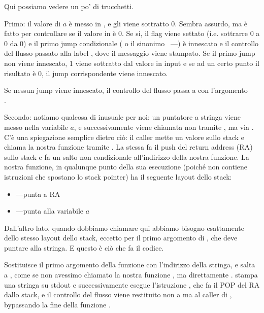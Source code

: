 Qui possiamo vedere un po' di trucchetti.


Primo: il valore di $a$ è messo in \EAX, e gli viene sottratto 0. Sembra assurdo, ma è fatto per controllare se il valore 
in \EAX è 0. Se si, il flag \ZF viene settato (i.e. sottrarre 0 a 0 da 0)
e il primo jump condizionale \JE ( o il sinonimo \JZ~---) è innescato e il controllo del flusso 
passato alla label , dove il messaggio  viene stampato. 
Se il primo jump non viene innescato, 1 viene sottratto dal valore in input e se ad un certo punto il risultato è 0, il jump corrispondente
viene innescato.

Se nessun jump viene innescato, il controllo del flusso passa a \printf con l'argomento \\
.

\label{jump_to_last_printf}
\myindex{\Stack}

Secondo: notiamo qualcosa di inusuale per noi: un puntatore a stringa viene messo nella variabile $a$, e 
successivamente viene chiamata \printf non tramite \CALL, ma via \JMP. C'è una spiegazione semplice dietro ciò: 
il \gls{caller} mette un valore sullo stack e chiama la nostra funzione tramite \CALL. 
La stessa \CALL fa il push del return address (\ac{RA}) sullo stack e fa un salto non condizionale all'indirizzo della nostra funzione. 
La nostra funzione, in qualunque punto della sua esecuzione (poiché non contiene istruzioni che spostano lo stack pointer)
ha il seguente layout dello stack:

\begin{itemize}
\item\ESP---punta a \ac{RA}
\item{}---punta alla variabile $a$ 
\end{itemize}

Dall'altro lato, quando dobbiamo chiamare \printf qui abbiamo bisogno esattamente dello stesso layout dello stack,
eccetto per il primo argomento di \printf, che deve puntare alla stringa. 
E questo è ciò che fa il codice.

Sostituisce il primo argomento della funzione con l'indirizzo della stringa, e salta a \printf, come se non avessimo chiamato
la nostra funzione \ttf, ma direttamente \printf.
\printf stampa una stringa su \gls{stdout} e successivamente esegue l'istruzione \RET , che fa il POP del 
\ac{RA} dallo stack, e il controllo del flusso viene restituito non a \ttf ma al \gls{caller} di \ttf, 
bypassando la fine della funzione \ttf.

